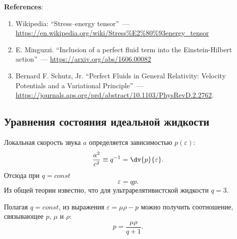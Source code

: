 \documentclass[\docroot/reports/draft/report.tex]{subfiles}
\begin{document}
    \textbf{\Large{References}}:
    \begin{enumerate}
        \item Wikipedia: \enquote{Stress–energy tensor}~--- \url{https://en.wikipedia.org/wiki/Stress%E2%80%93energy_tensor}
        \item E. Minguzzi. \enquote{Inclusion of a perfect fluid term into the Einstein-Hilbert action}~--- \url{https://arxiv.org/abs/1606.00082}
        \item \label{bib:schutz-velocity} Bernard F. Schutz, Jr. \enquote{Perfect Fluids in General Relativity: Velocity Potentials and a Variational Principle}~--- \url{https://journals.aps.org/prd/abstract/10.1103/PhysRevD.2.2762}.
    \end{enumerate}

\subsection{Уравнения состояния идеальной жидкости}

    Локальная скорость звука $a$ определяется зависимостью $p(\varepsilon)$:
    \begin{equation*}
        \frac{a^2}{c^2} \equiv q^{-1} = \dv{p}{\varepsilon} .
    \end{equation*}
    Отсюда при $q = const$
    \begin{equation*}
        \varepsilon = q p .
    \end{equation*}
    Из общей теории известно, что для ультрарелятивистской жидкости $q = 3$.

    Полагая $q = const$, из выражения $\varepsilon = \mu\rho - p$ можно получить соотношение, связывающее $p$, $\mu$ и $\rho$:
    \begin{equation}
        p = \frac{\mu\rho}{q + 1} .
    \end{equation}
\end{document}
